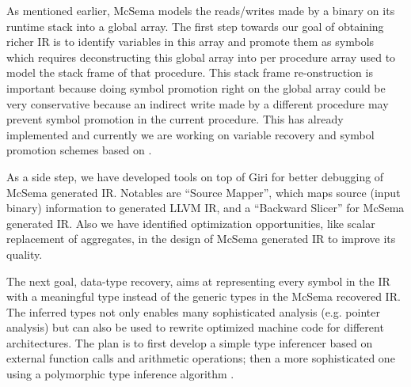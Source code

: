 \documentclass[10pt,twoside]{article}
\begin{document}
As mentioned earlier,  McSema models the reads/writes made by a binary on its
runtime stack into a global array.  The first step towards our goal of
obtaining richer IR is to identify variables in this array and promote them as
symbols which requires deconstructing this global array into per
procedure array used to model the stack frame of that procedure.  This stack
frame re-onstruction is important because doing symbol promotion right on the
global array could be very conservative because an indirect write made by a
different procedure may prevent symbol promotion in the current procedure.
This has already implemented and currently we are working on 
variable recovery and symbol promotion schemes based on
\cite{SECONDWRITE-EUROSYS-2013, DIVINE-VMCAI-2007}.

As a side step, we have developed tools \cite{SourceMapper} on top of
Giri\cite{GIRI-ASPLOS-2013} for better debugging of McSema generated IR.
Notables are ``Source Mapper'', which maps source (input binary) information
to generated LLVM IR, and a ``Backward Slicer'' for McSema generated IR. Also we
have identified optimization opportunities, like scalar replacement of
aggregates, in the design of McSema generated IR to improve its quality. 

The next goal, data-type recovery, aims at representing every symbol in the IR
with a meaningful type instead of the generic types in the McSema recovered IR.
The inferred types not only enables many sophisticated analysis (e.g. pointer
analysis) but can also be used to rewrite optimized machine code for different
architectures.  The plan is to first develop a simple type inferencer based on
external function calls and arithmetic operations; then a more sophisticated
one using a polymorphic type inference algorithm
\cite{POLYTYPEINFERENCE-PLDI-2016}.

\nocite{*}

\end{document}
